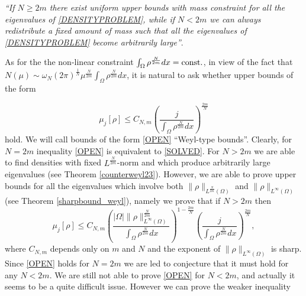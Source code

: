 \documentclass[11pt,a4paper]{amsart}
\numberwithin{equation}{section}
\begin{document}
 {\it ``If $N\geq 2m$ there exist uniform upper bounds with mass constraint for all the eigenvalues of \eqref{DENSITYPROBLEM}, while if $N<2m$ we can always redistribute a fixed amount of mass such that all the eigenvalues of \eqref{DENSITYPROBLEM} become arbitrarily large''}.

As for the the non-linear constraint $\int_{\Omega}\rho^{\frac{N}{2m}}dx={\rm const.}$, in view of the fact that $N(\mu)\sim\omega_N(2\pi)^{\frac{1}{N}}\mu^{\frac{N}{2m}}\int_{\Omega}\rho^{\frac{N}{2m}}dx$, it is natural to ask whether upper bounds of the form



\begin{equation}\label{OPEN}
\mu_j[\rho]\leq C_{N,m}\left(\frac{j}{\int_{\Omega}\rho^{\frac{N}{2m}}dx}\right)^{\frac{2m}{N}}
\end{equation}
hold. We will call bounds of the form \eqref{OPEN}  ``Weyl-type bounds''. Clearly, for $N=2m$ inequality \eqref{OPEN} is equivalent to \eqref{SOLVED}. For $N>2m$ we are able to find densities with fixed $L^{\frac{N}{2m}}$-norm and which produce arbitrarily large eigenvalues (see Theorem \ref{counterweyl23}). However, we are able to prove upper bounds for all the eigenvalues which involve both $\|\rho\|_{L^{\frac{N}{2m}}(\Omega)}$ and $\|\rho\|_{L^{\infty}(\Omega)}$ (see Theorem \ref{sharpbound_weyl}), namely we prove that if $N>2m$ then
\begin{equation}\label{PARTIAL}
\mu_j[\rho]\leq C_{N,m}\left(\frac{|\Omega|\|\rho\|_{L^{\infty}(\Omega)}^{\frac{N}{2m}}}{\int_{\Omega}\rho^{\frac{N}{2m}}dx}\right)^{1-\frac{2m}{N}}\left(\frac{j}{\int_{\Omega}\rho^{\frac{N}{2m}}dx}\right)^{\frac{2m}{N}},
\end{equation}
where $C_{N,m}$ depends only on $m$ and $N$ and the exponent of $\|\rho\|_{L^{\infty}(\Omega)}$ is sharp. Since \eqref{OPEN} holds for $N=2m$ we are led to conjecture that it must hold for any $N<2m$. We are still not able to prove \eqref{OPEN} for $N<2m$, and actually it seems to be a quite difficult issue. However we can prove the weaker inequality
\end{document}
